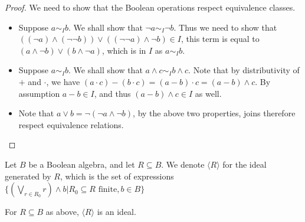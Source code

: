 \documentclass{../util/zariski-small}
\begin{document}
\begin{proof}
  We need to show that the Boolean operations respect equivalence classes. 
  \begin{itemize}
    \item 
      Suppose $a \sim_I b$. We shall show that $\neg a \sim_I \neg b$. 
      Thus we need to show that 
      $((\neg a) \wedge (\neg \neg b)) \vee ((\neg \neg a) \wedge \neg b) \in I$, 
      this term is equal to 
      $( a \wedge \neg b) \vee (b \wedge \neg a)$, which is in $I$ as $ a\sim_I b$. 
    \item 
      Suppose $ a\sim _I b $. We shall show that 
      $a \wedge c \sim_I b \wedge c$. 
      Note that by distributivity of $+$ and $\cdot$, we have 
      $(a \cdot c) -( b \cdot c) = (a -b ) \cdot c = (a-b) \wedge c$. 
      By assumption $a -b \in I$, and thus $(a-b) \wedge c \in I$ as well. 
    \item Note that $a \vee b = \neg ( \neg a \wedge \neg b)$, by the above two properties, 
      joins therefore respect equivalence relations. 
  \end{itemize}
\end{proof}
\begin{definition}
  Let $B$ be a Boolean algebra, and let $R\subseteq B$. 
  We denote $\langle R\rangle $ for the ideal generated by $R$, 
  which is the set of expressions 
  $\{(\bigvee_{r \in R_0} r) \wedge b| R_0\subseteq R \text{ finite}, b \in B\}$
\end{definition} 
\begin{remark}
  For $R\subseteq B$ as above, $ \langle R \rangle$ is an ideal.
\end{remark}
\end{document}
